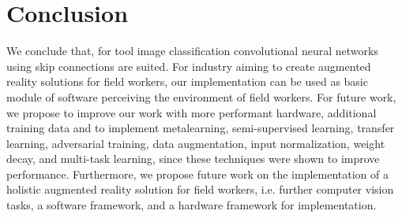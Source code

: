 \documentclass[a4paper, 10pt, journal]{wissarbIEEE}
\begin{document}
\section{Conclusion}
\label{sec:conclusion}
We conclude that, for tool image classification convolutional neural networks using skip connections are suited. For industry aiming to create augmented reality solutions for field workers, our implementation can be used as basic module of software perceiving the environment of field workers. 
For future work, we propose to improve our work with more performant hardware, additional training data and to implement metalearning, semi-supervised learning, transfer learning, adversarial training, data augmentation, input normalization, weight decay, and multi-task learning, since these techniques were shown to improve performance. \cite{Pan.2010, Szegedy.2014, ElAmir.2020} 
Furthermore, we propose future work on the implementation of a holistic augmented reality solution for field workers, i.e. further computer vision tasks, a software framework, and a hardware framework for implementation.

\end{document}
